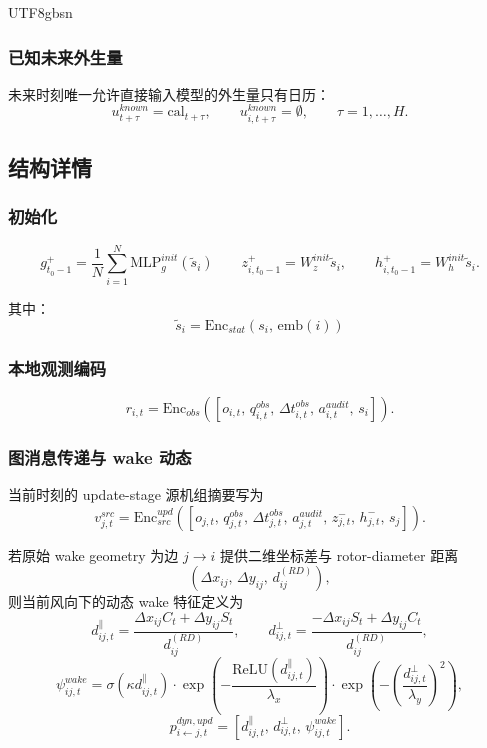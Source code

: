 \documentclass[11pt]{article}
\begin{document}
\begin{CJK}{UTF8}{gbsn}
\subsubsection{已知未来外生量}

未来时刻唯一允许直接输入模型的外生量只有日历：
\[
u^{known}_{t+\tau}=\mathrm{cal}_{t+\tau},\qquad u^{known}_{i,t+\tau}=\emptyset,\qquad \tau=1,\ldots,H.
\]

\subsection{结构详情}

\subsubsection{初始化}
\[
g^+_{t_0-1}=\frac{1}{N}\sum_{i=1}^{N}\mathrm{MLP}^{init}_g(\tilde s_i)\qquad
z^+_{i,t_0-1}=W^{init}_z \tilde s_i,\qquad
h^+_{i,t_0-1}=W^{init}_h \tilde s_i.
\]

其中：
\[
\tilde s_i=\mathrm{Enc}_{stat}(s_i,\, \mathrm{emb}(i))
\]

\subsubsection{本地观测编码}
\[
r_{i,t}=\mathrm{Enc}_{obs}\left([o_{i,t},\, q^{obs}_{i,t},\, \Delta t^{obs}_{i,t},\, a^{audit}_{i,t},\, s_i]\right).
\]

\subsubsection{图消息传递与 wake 动态}
当前时刻的 update-stage 源机组摘要写为
\[
v^{src}_{j,t}=\mathrm{Enc}^{upd}_{src}\left([o_{j,t},\, q^{obs}_{j,t},\, \Delta t^{obs}_{j,t},\, a^{audit}_{j,t},\, z^-_{j,t},\, h^-_{j,t},\, s_j]\right).
\]

若原始 wake geometry 为边 $j\to i$ 提供二维坐标差与 rotor-diameter 距离
\[
(\Delta x_{ij},\, \Delta y_{ij},\, d^{(RD)}_{ij}),
\]
则当前风向下的动态 wake 特征定义为
\[
d^{\parallel}_{ij,t}=\frac{\Delta x_{ij} C_t+\Delta y_{ij} S_t}{d^{(RD)}_{ij}},
\qquad
d^{\perp}_{ij,t}=\frac{-\Delta x_{ij} S_t+\Delta y_{ij} C_t}{d^{(RD)}_{ij}},
\]
\[
\psi^{wake}_{ij,t}=\sigma\!\left(\kappa d^{\parallel}_{ij,t}\right)\cdot
\exp\!\left(-\frac{\mathrm{ReLU}(d^{\parallel}_{ij,t})}{\lambda_x}\right)\cdot
\exp\!\left(-\left(\frac{d^{\perp}_{ij,t}}{\lambda_y}\right)^2\right),
\]
\[
p^{dyn,upd}_{i\leftarrow j,t}=\left[d^{\parallel}_{ij,t},\, d^{\perp}_{ij,t},\, \psi^{wake}_{ij,t}\right].
\]


\end{CJK}
\end{document}
